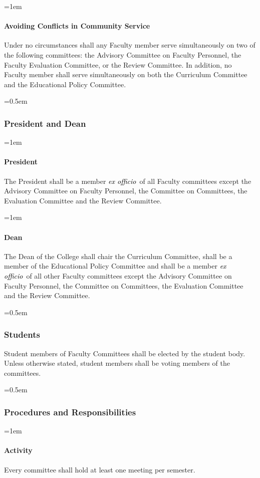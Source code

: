 \documentclass{manual}
\newcommand{\keyword}[1]{\textcolor{black}{#1}}
\newcommand{\exoff}{\keyword{\textit{ex officio}}~}
\let\oldsubsubsection\subsubsection
\renewcommand\subsubsection{\leftskip=0.5em\oldsubsubsection}
\let\oldparagraph\paragraph
\renewcommand\paragraph{\leftskip=1em\oldparagraph}
\begin{document}
\paragraph{Avoiding Conflicts in Community Service}
Under no circumstances shall any Faculty member serve simultaneously on two of the following committees: the Advisory Committee on Faculty Personnel, the Faculty Evaluation Committee, or the Review Committee. In addition, no Faculty member shall serve simultaneously on both the Curriculum Committee and the Educational Policy Committee.


\subsubsection{President and Dean}

\paragraph{President}
The President shall be a member \exoff of all Faculty committees except the Advisory Committee on Faculty Personnel, the Committee on Committees, the Evaluation Committee and the Review Committee.


\paragraph{Dean}
The Dean of the College shall chair the Curriculum Committee, shall be a member of the Educational Policy Committee and shall be a member \exoff of all other Faculty committees except the Advisory Committee on Faculty Personnel, the Committee on Committees, the Evaluation Committee and the Review Committee.


\subsubsection{Students}
Student members of Faculty Committees shall be elected by the student body. Unless otherwise stated, student members shall be voting members of the committees.


\subsubsection{Procedures and Responsibilities}

\paragraph{Activity}
Every committee shall hold at least one meeting per semester.
\end{document}
